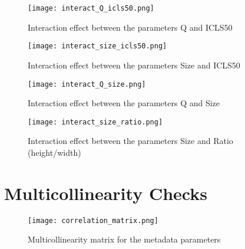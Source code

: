 \documentclass[12pt]{article}
\begin{document}
\begin{figure}[h]
	\begin{center}
		\texttt{[image: interact\_Q\_icls50.png]}
	\end{center}
	\caption{Interaction effect between the parameters Q and ICLS50}
	\label{fig:interact_Q_icls50}
\end{figure}

\begin{figure}[h]
	\begin{center}
		\texttt{[image: interact\_size\_icls50.png]}
	\end{center}
	\caption{Interaction effect between the parameters Size and ICLS50 }
	\label{fig:interact_size_icls50}
\end{figure}

\begin{figure}[h]
	\begin{center}
		\texttt{[image: interact\_Q\_size.png]}
	\end{center}
	\caption{Interaction effect between the parameters Q and Size}
	\label{fig:interact_Q_size}
\end{figure}

\begin{figure}[h]
	\begin{center}
		\texttt{[image: interact\_size\_ratio.png]}
	\end{center}
	\caption{Interaction effect between the parameters Size and Ratio (height/width)}
	\label{fig:interact_size_ratio}
\end{figure}

\clearpage
\section{Multicollinearity Checks}\label{Amulticol}

\begin{sidewaysfigure}[h]
    \centering
	\begin{center}
		\texttt{[image: correlation\_matrix.png]}
	\end{center}
	\caption{Multicollinearity matrix for the metadata parameters}
	\label{fig:multicol}
\end{sidewaysfigure}
\end{document}
